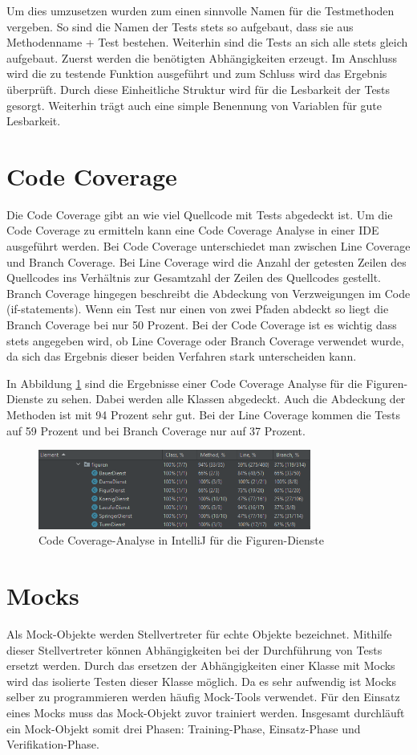 Um dies umzusetzen wurden zum einen sinnvolle Namen für die Testmethoden vergeben. So sind die Namen der Tests stets so aufgebaut, dass sie aus Methodenname + \glqq{}Test\grqq{} bestehen. Weiterhin sind die Tests an sich alle stets gleich aufgebaut. Zuerst werden die benötigten Abhängigkeiten erzeugt. Im Anschluss wird die zu testende Funktion ausgeführt und zum Schluss wird das Ergebnis überprüft. Durch diese Einheitliche Struktur wird für die Lesbarkeit der Tests gesorgt.  Weiterhin trägt auch eine simple Benennung von Variablen für gute Lesbarkeit.

\section{Code Coverage}
Die Code Coverage gibt an wie viel Quellcode mit Tests abgedeckt ist. Um die Code Coverage zu ermitteln kann eine Code Coverage Analyse in einer IDE ausgeführt werden. Bei Code Coverage unterschiedet man zwischen Line Coverage und Branch Coverage. Bei Line Coverage wird die Anzahl der getesten Zeilen des Quellcodes ins Verhältnis zur Gesamtzahl der Zeilen des Quellcodes gestellt. Branch Coverage hingegen beschreibt die Abdeckung von Verzweigungen im Code (if-statements). Wenn ein Test nur einen von zwei Pfaden abdeckt so liegt die Branch Coverage bei nur 50 Prozent. Bei der Code Coverage ist es wichtig dass stets angegeben wird, ob Line Coverage oder Branch Coverage verwendet wurde, da sich das Ergebnis dieser beiden Verfahren stark unterscheiden kann.

In Abbildung \ref{fig:CodeCoverage} sind die Ergebnisse einer Code Coverage Analyse für die Figuren-Dienste zu sehen. Dabei werden alle Klassen abgedeckt. Auch die Abdeckung der Methoden ist mit 94 Prozent sehr gut. Bei der Line Coverage kommen die Tests auf 59 Prozent und bei Branch Coverage nur auf 37 Prozent.
\begin{figure}[ht]
	\centering
	\includegraphics[width=0.8\textwidth]{Bilder/CodeCoverage.png} 
	\caption{Code Coverage-Analyse in IntelliJ für die Figuren-Dienste}
	\label{fig:CodeCoverage}
\end{figure}


\section{Mocks}
Als Mock-Objekte werden Stellvertreter für echte Objekte bezeichnet. Mithilfe dieser Stellvertreter können Abhängigkeiten bei der Durchführung von Tests ersetzt werden. Durch das ersetzen der Abhängigkeiten einer Klasse mit Mocks wird das isolierte Testen dieser Klasse möglich. Da es sehr aufwendig ist Mocks selber zu programmieren werden häufig Mock-Tools verwendet. Für den Einsatz eines Mocks muss das Mock-Objekt zuvor trainiert werden. Insgesamt durchläuft ein Mock-Objekt somit drei Phasen: Training-Phase, Einsatz-Phase und Verifikation-Phase. 

